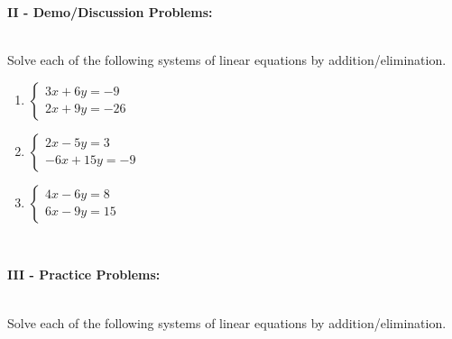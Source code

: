 \documentclass[12pt]{article}
\theoremstyle{definition}
\begin{document}
{\bf II - Demo/Discussion Problems:}\\
\ \par
Solve each of the following systems of linear equations by addition/elimination.
\begin{multicols}{3}
	\begin{enumerate}
		\item $\begin{cases}
					3x+6y=-9\\
			    2x+9y=-26
					\end{cases}$
		\item $\begin{cases}
					2x-5y=3\\
					-6x+15y=-9
					\end{cases}$
		\item $\begin{cases}
					4 x - 6 y = 8\\
					6 x - 9 y = 15
					\end{cases}$
	\end{enumerate}
\end{multicols}
\ \par
{\bf III - Practice Problems:}\\
\ \par
Solve each of the following systems of linear equations by addition/elimination.
\end{document}
